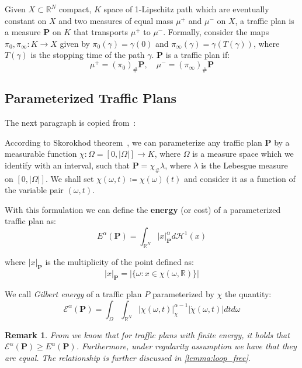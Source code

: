 \documentclass[11pt,reqno,a4paper]{amsart}
\numberwithin{equation}{section}
\theoremstyle{mytheorem}
\theoremstyle{myremark}
\newtheorem{remark}[subsection]{Remark}
\theoremstyle{myparagraph}
\begin{document}
    Given $X \subset \mathbb{R}^N$ compact, $K$ space of 1-Lipschitz path which are eventually constant on $X$ and
    two measures of equal mass $\mu^+$ and $\mu^-$ on $X$, a traffic plan is a measure $\mathbf{P}$ on $K$ that transports $\mu^+$ to $\mu^-$.
    Formally, consider the maps $\pi_0, \pi_\infty : K \rightarrow X$ given by $\pi_0(\gamma) = \gamma(0)$ and $\pi_\infty(\gamma) = \gamma(T(\gamma))$, where $T(\gamma)$
    is the stopping time of the path $\gamma$.
    $\mathbf{P}$ is a traffic plan if:
    \[
        \mu^+ = (\pi_0)_{\#}\mathbf{P}, \quad \mu^- = (\pi_\infty)_{\#}\mathbf{P}
    \]

    \subsection{Parameterized Traffic Plans}
    The next paragraph is copied from~\cite{Bernot}:

    According to Skorokhod theorem~\cite[Theorem A.3]{Bernot}, we can parameterize any traffic plan $\mathbf{P}$ by a measurable function
    $\chi : \Omega = [0, |\Omega|] \rightarrow K$, where $\Omega$ is a measure space which we identify with an interval, such that
    $\mathbf{P}= \chi_{\#} \lambda$, where $\lambda$ is the Lebesgue measure on $[0, |\Omega|]$.
    We shall set $\chi(\omega, t) \coloneqq \chi(\omega)(t)$ and consider it as a function of the variable pair
    $(\omega, t)$.

    With this formulation we can define the \textbf{energy} (or cost) of a parameterized traffic plan as:
    \begin{equation}
        E^{\alpha}(\mathbf{P}) = \int_{\mathbb{R}^N} |x|_\mathbf{P}^{\alpha} d \mathcal{H}^1(x)
    \end{equation}

    where $|x|_\mathbf{P}$ is the multiplicity of the point defined as:
    \begin{equation}
        |x|_\mathbf{P} = | \{\omega: x \in \chi(\omega, \mathbb{R}) \} |
    \end{equation}


    We call \emph{Gilbert energy} of a traffic plan $P$ parameterized by $\chi$ the quantity:
    \begin{equation}
        \mathcal{E}^{\alpha}(\mathbf{P}) = \int_{\Omega} \int_{\mathbb{R}^N} |\chi(\omega, t)|^{\alpha-1}_\chi |\dot{\chi} (\omega, t)| dtd\omega
    \end{equation}

    \begin{remark}
        From \cite[Proposition 4.8]{Bernot} we know that for traffic plans with finite energy, it holds that $\mathcal{E} ^\alpha(\mathbf{P}) \ge E^\alpha (\mathbf{P})$.
        Furthermore, under regularity assumption \cite[definition 4.7]{Bernot} we have that they are equal.
        The relationship is further discussed in \ref{lemma:loop_free}.

    \end{remark}
\end{document}

